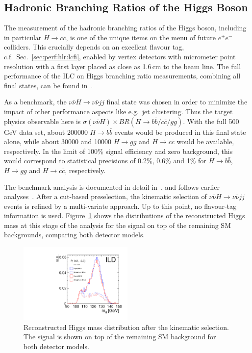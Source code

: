 \subsection{Hadronic Branching Ratios of the Higgs Boson}

The measurement of the hadronic branching ratios of the Higgs boson,
including in particular $H\to c\bar{c}$, is one of the unique items
on the menu of future $e^+e^-$ colliders. This crucially depends on 
an excellent flavour tag, c.f.\ Sec.~\ref{sec:perf:hlr:lcfi}, enabled
by vertex detectors with micrometer point resolution with a first layer placed as close as 1.6\,cm to the beam line. The full performance of the ILC on Higgs branching ratio measurements, combining all final states,  can be found in~\cite{Bambade:2019fyw}.

As a benchmark, the $\nu \bar{\nu} H \to \nu \bar{\nu} jj$ final state was chosen in order to minimize the impact of other performance aspects like e.g.\ jet clustering. Thus the target physics observable here is $\sigma(\nu\bar{\nu} H)\times BR(H\to b\bar{b} / c\bar{c} / gg)$. With the full 500\,GeV data set, about 200000 $H \to b\bar{b}$ events would be produced in this final state alone, while about 30000 and 10000 $H \to gg$ and $H \to c\bar{c}$ would be available, respectively. In the 
limit of 100\% signal efficiency and zero background, this would correspond to statistical precisions of 0.2\%, 0.6\% and 1\% for $H \to b\bar{b}$, $H \to gg$ and $H \to c\bar{c}$, respectively.

The benchmark analysis is documented in detail in~\cite{ILDNote:Hbbccgg}, and follows earlier analyses~\cite{Mueller:2016exq,Ono:2013voc,Ono:2013sea}.  After a cut-based preselection, the kinematic selection of $\nu \bar{\nu} H \to \nu \bar{\nu} jj$ events is refined by a multi-variate approach. Up to this point, no flavour-tag information is used.
Figure~\ref{fig:Hbbccgg:mh} shows the distributions of the reconstructed Higgs mass at this stage of the analysis for the signal on top of the remaining SM backgrounds, comparing both detector models.

\begin{figure}[htbp]
\begin{center}
 \includegraphics[width=0.5\textwidth]{Performance/fig/IDRplot5.pdf}
\end{center}
\caption{Reconstructed Higgs mass distribution after the kinematic selection. The signal is shown on top of the remaining SM background for both detector models.
}
\label{fig:Hbbccgg:mh}
\end{figure}


